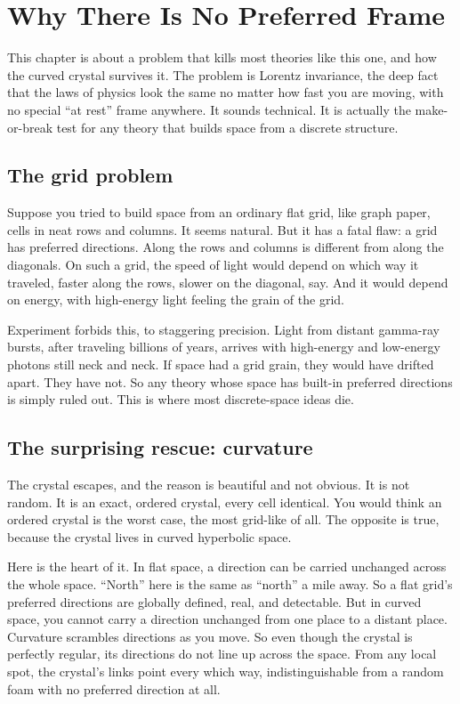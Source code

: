 \section{Why There Is No Preferred Frame}

This chapter is about a problem that kills most theories like this one, and how the curved crystal survives it. The problem is Lorentz invariance, the deep fact that the laws of physics look the same no matter how fast you are moving, with no special ``at rest'' frame anywhere. It sounds technical. It is actually the make-or-break test for any theory that builds space from a discrete structure.

\subsection{The grid problem}

Suppose you tried to build space from an ordinary flat grid, like graph paper, cells in neat rows and columns. It seems natural. But it has a fatal flaw: a grid has preferred directions. Along the rows and columns is different from along the diagonals. On such a grid, the speed of light would depend on which way it traveled, faster along the rows, slower on the diagonal, say. And it would depend on energy, with high-energy light feeling the grain of the grid.

Experiment forbids this, to staggering precision. Light from distant gamma-ray bursts, after traveling billions of years, arrives with high-energy and low-energy photons still neck and neck. If space had a grid grain, they would have drifted apart. They have not. So any theory whose space has built-in preferred directions is simply ruled out. This is where most discrete-space ideas die.

\subsection{The surprising rescue: curvature}

The crystal escapes, and the reason is beautiful and not obvious. It is not random. It is an exact, ordered crystal, every cell identical. You would think an ordered crystal is the worst case, the most grid-like of all. The opposite is true, because the crystal lives in curved hyperbolic space.

Here is the heart of it. In flat space, a direction can be carried unchanged across the whole space. ``North'' here is the same as ``north'' a mile away. So a flat grid's preferred directions are globally defined, real, and detectable. But in curved space, you cannot carry a direction unchanged from one place to a distant place. Curvature scrambles directions as you move. So even though the crystal is perfectly regular, its directions do not line up across the space. From any local spot, the crystal's links point every which way, indistinguishable from a random foam with no preferred direction at all.

